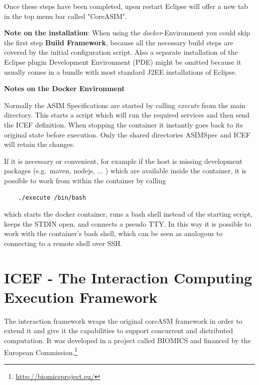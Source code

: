 Once these steps have been completed, upon restart Eclipse will offer a new tab in the top menu bar called "CoreASIM".

\textbf{Note on the installation}: When using the \textit{docker}-Environment you could skip the first step \textbf{Build Framework}, because all the necessary build steps are covered by the initial configuration script. Also a separate installation of the Eclipse plugin Development Environment (PDE) might be omitted because it usually comes in a bundle with most standard J2EE installations of Eclipse.

\textbf{Notes on the Docker Environment}
\label{sec_inner:note-docker}

Normally the ASIM Specifications are started by calling \textit{execute} from the main directory. This starts a script which will run the required services and then send the ICEF definition. When stopping the container it instantly goes back to its original state before execution. Only the shared directories ASIMSpec and ICEF will retain the changes.

If it is necessary or convenient, for example if the host is missing development packages (e.g.\ maven, nodejs, ... ) which are available inside the container, it is possible to work from within the container by calling
\begin{lstlisting}
	./execute /bin/bash
\end{lstlisting}
which starts the docker container, runs a bash shell instead of the starting script, keeps the STDIN open, and connects a pseudo TTY. In this way it is possible to work with the container's bash shell, which can be seen as analogous to connecting to a remote shell over SSH.

\section{ICEF - The Interaction Computing Execution Framework}
\label{sec:icef-intro}
The interaction framework wraps the original coreASM framework in order to extend it and give it the capabilities to support concurrent and distributed computation. It was developed in a project called BIOMICS and financed by the European Commission.\footnote{\url{http://biomicsproject.eu/}}

